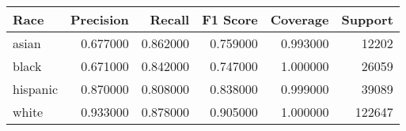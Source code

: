 \begin{tabular}{lrrrrr}
\toprule
Race & Precision & Recall & F1 Score & Coverage & Support \\
\midrule
asian & 0.677000 & 0.862000 & 0.759000 & 0.993000 & 12202 \\
black & 0.671000 & 0.842000 & 0.747000 & 1.000000 & 26059 \\
hispanic & 0.870000 & 0.808000 & 0.838000 & 0.999000 & 39089 \\
white & 0.933000 & 0.878000 & 0.905000 & 1.000000 & 122647 \\
\bottomrule
\end{tabular}
